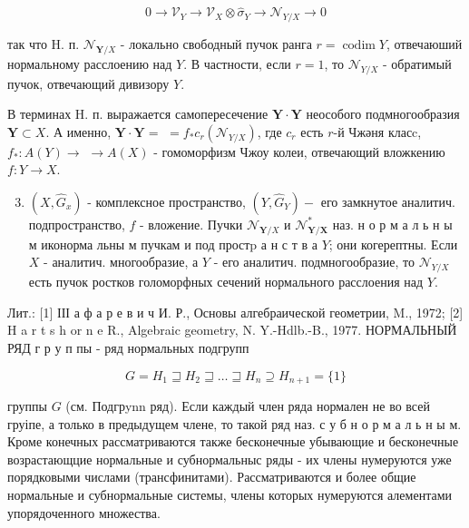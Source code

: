 \documentclass[10pt]{article}
\begin{document}
\[

0 \rightarrow \mathscr{V}_{Y} \rightarrow \mathscr{\mathscr { V }}_{X} \otimes \widehat{\sigma}_{Y} \rightarrow \mathcal{N}_{Y / X} \rightarrow 0

\]



так что H. п. $\mathcal{N}_{\boldsymbol{Y} / X}$ - локально свободный пучок ранга $r=\operatorname{codim} Y$, отвечаюший нормальному расслоению над $Y$. В частности, если $r=1$, то $\mathcal{N}_{Y / X}$ - обратимый пучок, отвечающий дивизору $Y$.



В терминах H. п. выражается самопересечение $\boldsymbol{Y} \cdot \boldsymbol{Y}$ неособого подмногообразия $\boldsymbol{Y} \subset X$. А именно, $\boldsymbol{Y} \cdot \boldsymbol{Y}=$ $=f_{*} c_{r}\left(\mathcal{N}_{Y / X}\right)$, где $c_{r}$ есть $r$-й Чжәня класc, $f_{*}: A(Y) \rightarrow$ $\rightarrow A(X)$ - гомоморфизм Чжоу колеи, отвечающий вложкению $f: Y \rightarrow X$.



\begin{enumerate}

  \setcounter{enumi}{2}

  \item $\left(X, \hat{G}_{x}\right)$ - комплексное пространство, $\left(Y, \widehat{G}_{Y}\right)-$ его замкнутое аналитич. подпространство, $f$ - вложение. Пучки $\mathcal{N}_{\boldsymbol{Y} / X}$ и $\mathcal{N}_{\boldsymbol{Y} / \boldsymbol{X}}^{*}$ наз. н о р м а л ь н ы м иконорма льны м пучкам и под простp а н с т в а $Y$; они когерептны. Если $X$ - аналитич. многообразие, а $Y$ - его аналитич. подмногообразие, то $\mathcal{N}_{Y / X}$ есть пучок ростков голоморфных сечений нормального расслоения над $Y$.

\end{enumerate}



Лит.: [1] ІІІ а ф а р е в и ч И. Р., Основы алгебраической геометрии, M., 1972; [2] H a r t s h or n e R., Algebraic geometry, N. Y.-Hdlb.-B., 1977. НОРМАЛЬНЫЙ РЯД г р у п пы - ряд нормальных подгрупп



\[

G=H_{1} \sqsupseteq H_{2} \sqsupseteq \ldots \sqsupseteq H_{n} \supseteq H_{n+1}=\{1\}

\]



группы $G$ (см. Подгрynn ряд). Если каждый член ряда нормален не во всей груіпе, а только в предыдущем члене, то такой ряд наз. с у б н о р м а л ь н ы м. Кроме конечных рассматриваются также бесконечные убывающие и бесконечные возрастающцие нормальные и субнормальныс ряды - их члены нумеруются уже порядковыми числами (трансфинитами). Рассматриваются и более общие нормальные и субнормальные системы, члены которых нумеруются алементами упорядоченного множества.
\end{document}
